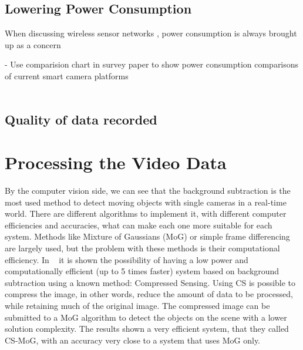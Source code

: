 \documentclass[journal,transmag]{IEEEtran}
\begin{document}
\subsection{Lowering Power Consumption}
When discussing wireless sensor networks , power consumption is always brought up as a concern 

\-- Use comparision chart in survey paper to show power consumption comparisons of current smart camera platforms\\ \\

\subsection{Quality of data recorded}

\section{Processing the Video Data}

By the computer vision side, we can see that the background subtraction is the most used method to detect moving objects with single cameras in a 
real-time world. There are different algorithms to implement it, with different computer efficiencies and accuracies, what can make each one more
suitable for each system. Methods like Mixture of Gaussians (MoG) or simple frame differencing are largely used, but the problem with these methods is
their computational efficiency. In ~\cite{CS-MoG} it is shown the possibility of having a low power and computationally efficient (up to 5 times
faster) system based on background subtraction using a known method: Compressed Sensing. Using CS is possible to compress the image, in other words,
reduce the amount of data to be processed, while retaining much of the original image. The compressed image can be submitted to a MoG algorithm to
detect the objects on the scene with a lower solution complexity. The results shown a very efficient system, that they called CS-MoG, with an accuracy
very close to a system that uses MoG only.
\end{document}
